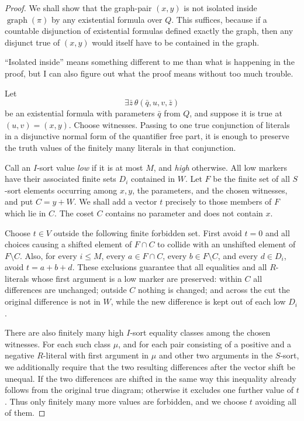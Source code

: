 \documentclass[12pt]{article}
\newcommand{\review}[1]{\begin{reviewbox}#1\end{reviewbox}}
\begin{document}
\begin{proof}
We shall show that the graph-pair $(x,y)$ is not isolated inside
$\operatorname{graph}(\pi)$ by any existential formula over $Q$.  This
suffices, because if a countable disjunction of existential formulas
defined exactly the graph, then any disjunct true of $(x,y)$ would itself
have to be contained in the graph.

\review{``Isolated inside'' means something different to me than what is happening in the proof, but I can also figure out what the proof means without too much trouble.}

Let
\[
        \exists \bar z\,\theta(\bar q,u,v,\bar z)
\]
be an existential formula with parameters $\bar q$ from $Q$, and suppose
it is true at $(u,v)=(x,y)$.  Choose witnesses.  Passing to one true
conjunction of literals in a disjunctive normal form of the quantifier
free part, it is enough to preserve the truth values of the finitely many
literals in that conjunction.

Call an $I$-sort value \emph{low} if it is at most $M$, and
\emph{high} otherwise.  All low markers have their associated finite
sets $D_i$ contained in $W$.  Let $F$ be the finite set of all $S$-sort
elements occurring among $x,y$, the parameters, and the chosen witnesses,
and put $C=y+W$.  We shall add a vector $t$ precisely to those members of
$F$ which lie in $C$.  The coset $C$ contains no parameter and does not
contain $x$.

Choose $t\in V$ outside the following finite forbidden set.  First avoid
$t=0$ and all choices causing a shifted element of $F\cap C$ to collide
with an unshifted element of $F\setminus C$.  Also, for every
$i\le M$, every $a\in F\cap C$, every $b\in F\setminus C$, and every
$d\in D_i$, avoid $t=a+b+d$.  These exclusions guarantee that all
equalities and all $R$-literals whose first argument is a low marker are
preserved: within $C$ all differences are unchanged; outside $C$ nothing
is changed; and across the cut the original difference is not in $W$,
while the new difference is kept out of each low $D_i$.

There are also finitely many high $I$-sort equality classes among the
chosen witnesses. For each such class $\mu$, and for each pair
consisting of a positive and a negative $R$-literal with first argument
in $\mu$ and other two arguments in the $S$-sort, we additionally require
that the two resulting differences after the vector shift be unequal.
If the two differences are shifted in the same way this inequality
already follows from the original true diagram; otherwise it excludes
one further value of $t$.  Thus only finitely many more values are
forbidden, and we choose $t$ avoiding all of them.


\end{proof}
\end{document}
